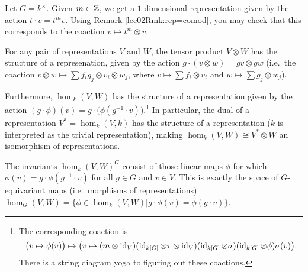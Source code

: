 \begin{example}
 Let $G=k^\times$. Given $m\in \mathbb{Z}$, we get a $1$-dimensional representation given by the action $t\cdot v=t^mv$. Using Remark \ref{lec02Rmk:rep=comod}, you may check that this corresponds to the coaction $v\mapsto t^m\otimes v$.
\end{example}
\begin{remark}
 For any pair of representations $V$ and $W$, the tensor product $V\otimes W$ has the structure of a represenation, given by the action $g\cdot (v\otimes w)=gv\otimes gw$ (i.e.~the coaction $v\otimes w\mapsto \sum f_ig_j\otimes v_i\otimes w_j$, where $v\mapsto \sum f_i\otimes v_i$ and $w\mapsto \sum g_j\otimes w_j$).

 Furthermore, $\hom_k(V,W)$ has the structure of a representation given by the action $(g\cdot \phi)(v)=g\cdot \bigl(\phi(g^{-1}\cdot v)\bigr)$.\footnote{The corresponding coaction is \[\bigl(v\mapsto \phi(v)\bigr)\mapsto \bigl(v\mapsto (m\otimes \operatorname{id}_V)(\operatorname{id}_{k[G]}\otimes \tau\otimes\operatorname{id}_V)(\operatorname{id}_{k[G]}\otimes\sigma)(\operatorname{id}_{k[G]}\otimes\phi)\sigma(v)\bigr).\] There is a string diagram yoga to figuring out these coactions.} In particular, the dual of a representation $V^*=\hom_k(V,k)$ has the structure of a representation ($k$ is interpreted as the trivial representation), making $\hom_k(V,W)\cong V^*\otimes W$ an isomorphism of representations.
 
 The invariants $\hom_k(V,W)^G$ consist of those linear maps $\phi$ for which $\phi(v)=g\cdot \phi(g^{-1}\cdot v)$ for all $g\in G$ and $v\in V$. This is exactly the space of $G$-equivariant maps (i.e.~morphisms of representations) $\hom_G(V,W)=\{\phi\in\hom_k(V,W)|g\cdot \phi(v)=\phi(g\cdot v)\}$.
\end{remark}

